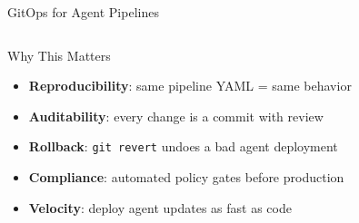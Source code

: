 \begin{frame}{\fontsize{10}{12}\selectfont GitOps for Agent Pipelines}
\begin{columns}[T]
    \begin{exampleblock}{\fontsize{6}{7}\selectfont Why This Matters}
      \fontsize{5.5}{6.5}\selectfont
      \begin{itemize}
        \setlength{\itemsep}{0pt}
        \item \textbf{Reproducibility}: same pipeline YAML = same behavior
        \item \textbf{Auditability}: every change is a commit with review
        \item \textbf{Rollback}: \texttt{git revert} undoes a bad agent deployment
        \item \textbf{Compliance}: automated policy gates before production
        \item \textbf{Velocity}: deploy agent updates as fast as code
      \end{itemize}
    \end{exampleblock}
  \end{columns}
\end{frame}


